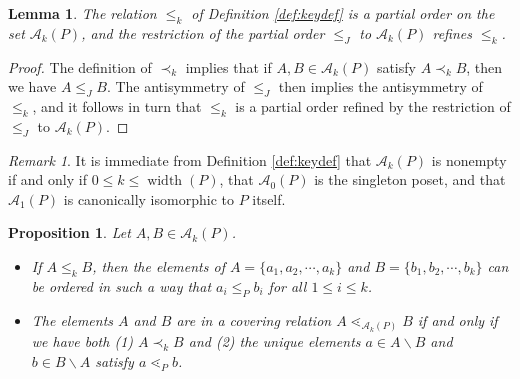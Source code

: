 \documentclass[11pt]{amsart}
\theoremstyle{plain}
\newtheorem{lemma}[theorem]{Lemma}
\newtheorem{proposition}[theorem]{Proposition}
\theoremstyle{definition}
\theoremstyle{remark}
\newtheorem{remark}[theorem]{Remark}
\numberwithin{equation}{section}
\newcommand{\cala}{\mathcal{A}}
\newcommand{\akp}{\mathcal{A}_k(P)}
\DeclareMathOperator{\width}{\mathrm{width}}
\begin{document}
\begin{lemma}\label{lemma:new_poset}
The relation $\leq_k$ of Definition \ref{def:keydef} is a partial order on the
set $\cala_k(P)$, and the restriction of the partial order $\leq_J$ to
$\cala_k(P)$ refines $\leq_k$. \end{lemma}

\begin{proof}
The definition of $\prec_k$ implies that if $A, B \in \cala_k(P)$ satisfy $A \prec_k B$,
then we have $A \leq_J B$.  The antisymmetry of $\leq_J$ then implies the
antisymmetry of $\leq_k$, and it follows in turn that $\leq_k$ is a partial
order refined by the restriction of $\leq_J$ to $\akp$. 
\end{proof}

\begin{remark}
    \label{rmk:immediate} It is immediate from Definition \ref{def:keydef} that
      $\akp$ is nonempty if and only if $0\le k\le \width(P)$, that $\cala_0(P)$
      is the singleton poset, and that $\cala_1(P)$ is canonically isomorphic to
      $P$ itself.
  \end{remark}

\begin{proposition}\label{prop:basics}
Let $A,B\in \akp$. 
\begin{itemize} 
\item [(i)]  If $A \leq_k B$, then the elements of $A = \{a_1, a_2, \cdots,
     a_k\}$ and $B = \{b_1, b_2, \cdots, b_k\}$ can be ordered in such a way
     that $a_i \leq_P b_i$ for all $1 \leq i \leq k$.
 \item [(ii)] The elements $A$ and $B$ are in a covering relation
      $A\lessdot_{\cala_k(P)} B$ if and only if we have both (1) $A \prec_k B$
      and (2) the unique elements $a \in A \backslash B$ and $b \in B \backslash
      A$ satisfy $a \lessdot_P b$.
\end{itemize}
\end{proposition}
\end{document}
